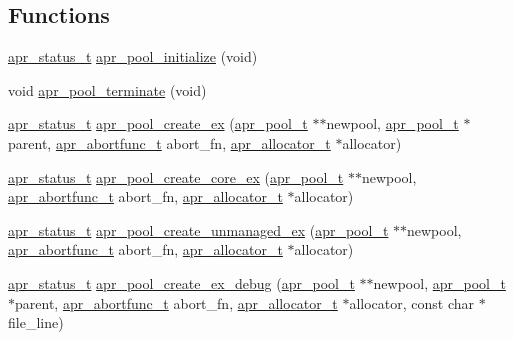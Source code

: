 \subsection*{Functions}
\begin{DoxyCompactItemize}
\item 
\hyperlink{group__apr__errno_gaf76ee4543247e9fb3f3546203e590a6c}{apr\+\_\+status\+\_\+t} \hyperlink{group__apr__pools_gad64a6a29515621bc13f8a8da50366d67}{apr\+\_\+pool\+\_\+initialize} (void)
\item 
void \hyperlink{group__apr__pools_ga3728aacec227318cef973b8a33f3b430}{apr\+\_\+pool\+\_\+terminate} (void)
\item 
\hyperlink{group__apr__errno_gaf76ee4543247e9fb3f3546203e590a6c}{apr\+\_\+status\+\_\+t} \hyperlink{group__apr__pools_gab274bd29e4e4d4944b4618403148074f}{apr\+\_\+pool\+\_\+create\+\_\+ex} (\hyperlink{group__apr__pools_gaf137f28edcf9a086cd6bc36c20d7cdfb}{apr\+\_\+pool\+\_\+t} $\ast$$\ast$newpool, \hyperlink{group__apr__pools_gaf137f28edcf9a086cd6bc36c20d7cdfb}{apr\+\_\+pool\+\_\+t} $\ast$parent, \hyperlink{group__apr__pools_ga370a939349adf6d1438068e2fc69a0dd}{apr\+\_\+abortfunc\+\_\+t} abort\+\_\+fn, \hyperlink{group__apr__allocator_ga1ceabfd30fcfc455e47d052d2a24244b}{apr\+\_\+allocator\+\_\+t} $\ast$allocator)
\item 
\hyperlink{group__apr__errno_gaf76ee4543247e9fb3f3546203e590a6c}{apr\+\_\+status\+\_\+t} \hyperlink{group__apr__pools_ga20e514c83555398acddc30c4dfa0c540}{apr\+\_\+pool\+\_\+create\+\_\+core\+\_\+ex} (\hyperlink{group__apr__pools_gaf137f28edcf9a086cd6bc36c20d7cdfb}{apr\+\_\+pool\+\_\+t} $\ast$$\ast$newpool, \hyperlink{group__apr__pools_ga370a939349adf6d1438068e2fc69a0dd}{apr\+\_\+abortfunc\+\_\+t} abort\+\_\+fn, \hyperlink{group__apr__allocator_ga1ceabfd30fcfc455e47d052d2a24244b}{apr\+\_\+allocator\+\_\+t} $\ast$allocator)
\item 
\hyperlink{group__apr__errno_gaf76ee4543247e9fb3f3546203e590a6c}{apr\+\_\+status\+\_\+t} \hyperlink{group__apr__pools_gaae7212db77bb57f86419cd594f73a92f}{apr\+\_\+pool\+\_\+create\+\_\+unmanaged\+\_\+ex} (\hyperlink{group__apr__pools_gaf137f28edcf9a086cd6bc36c20d7cdfb}{apr\+\_\+pool\+\_\+t} $\ast$$\ast$newpool, \hyperlink{group__apr__pools_ga370a939349adf6d1438068e2fc69a0dd}{apr\+\_\+abortfunc\+\_\+t} abort\+\_\+fn, \hyperlink{group__apr__allocator_ga1ceabfd30fcfc455e47d052d2a24244b}{apr\+\_\+allocator\+\_\+t} $\ast$allocator)
\item 
\hyperlink{group__apr__errno_gaf76ee4543247e9fb3f3546203e590a6c}{apr\+\_\+status\+\_\+t} \hyperlink{group__apr__pools_gacbea97ae5c0c861f6b7c147d46ac1d0c}{apr\+\_\+pool\+\_\+create\+\_\+ex\+\_\+debug} (\hyperlink{group__apr__pools_gaf137f28edcf9a086cd6bc36c20d7cdfb}{apr\+\_\+pool\+\_\+t} $\ast$$\ast$newpool, \hyperlink{group__apr__pools_gaf137f28edcf9a086cd6bc36c20d7cdfb}{apr\+\_\+pool\+\_\+t} $\ast$parent, \hyperlink{group__apr__pools_ga370a939349adf6d1438068e2fc69a0dd}{apr\+\_\+abortfunc\+\_\+t} abort\+\_\+fn, \hyperlink{group__apr__allocator_ga1ceabfd30fcfc455e47d052d2a24244b}{apr\+\_\+allocator\+\_\+t} $\ast$allocator, const char $\ast$file\+\_\+line)

\end{DoxyCompactItemize}

